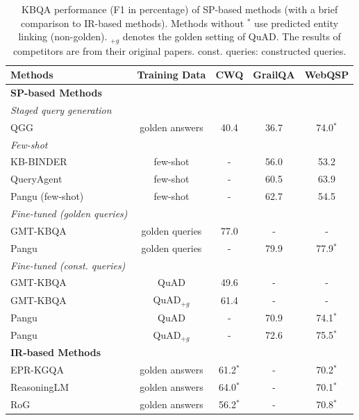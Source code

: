 \documentclass[runningheads]{llncs}
\begin{document}
\begin{table}[t]
\centering
\caption{KBQA performance (F1 in percentage) of SP-based methods (with a brief comparison to IR-based methods).
Methods without $^*$ use predicted entity linking (non-golden).
$_{+g}$ denotes the golden setting of QuAD. 
The results of competitors are from their original papers. const. queries: constructed queries.}
\label{table:kbqa_performance}
\setlength{\tabcolsep}{6pt} 
\begin{tabular}{lcccc}
    \toprule
    \textbf{Methods} & \textbf{Training Data} & \textbf{CWQ} & \textbf{GrailQA} & \textbf{WebQSP} \\
    \midrule
    \multicolumn{5}{l}{\textbf{SP-based Methods}} \\
    \textit{Staged query generation} & & & & \\
    QGG & golden answers & 40.4 & 36.7 & 74.0$^*$ \\
    \addlinespace
    \textit{Few-shot} & & & & \\
    KB-BINDER & few-shot & - & 56.0 & 53.2 \\
    QueryAgent & few-shot & - & 60.5 & 63.9 \\
    Pangu (few-shot) & few-shot & - & 62.7 & 54.5 \\
    \addlinespace
    \textit{Fine-tuned (golden queries)} & & & & \\
    GMT-KBQA & golden queries & 77.0 & - & - \\
    Pangu & golden queries & - & 79.9 & 77.9$^*$ \\
    \addlinespace
    \textit{Fine-tuned (const. queries)} & & & & \\
    GMT-KBQA & QuAD & 49.6 & - & - \\
    GMT-KBQA & QuAD$_{+g}$ & 61.4 & - & - \\
    Pangu & QuAD & - & 70.9 & 74.1$^*$ \\
    Pangu & QuAD$_{+g}$ & - & 72.6 & 75.5$^*$ \\
    \midrule
    \multicolumn{5}{l}{\textbf{IR-based Methods}} \\
    EPR-KGQA & golden answers & 61.2$^*$ & - & 70.2$^*$ \\
    ReasoningLM & golden answers & 64.0$^*$ & - & 70.1$^*$ \\
    RoG & golden answers & 56.2$^*$ & - & 70.8$^*$ \\
    \bottomrule
\end{tabular}
\vspace{-1em}
\end{table}
 
\end{document}
